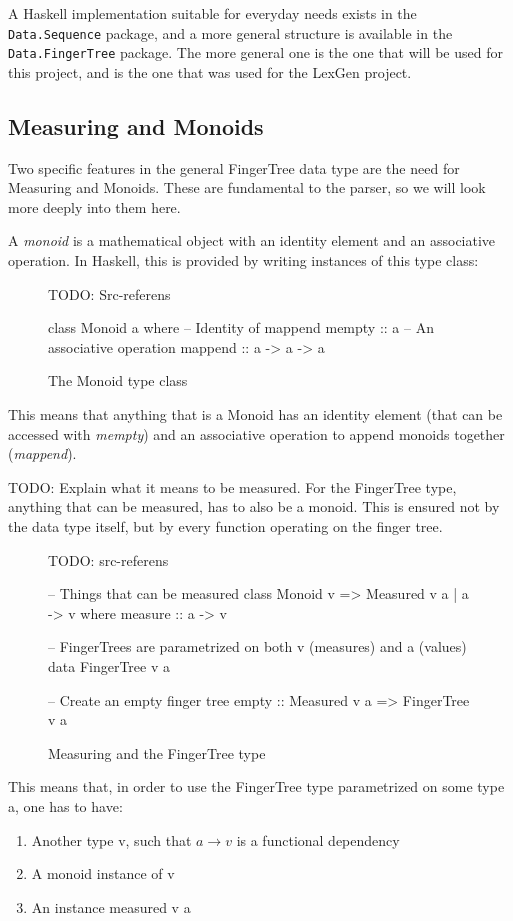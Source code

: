 \documentclass[a4paper,12pt,twosided]{report}
\begin{document}
A Haskell implementation suitable for everyday needs exists in the
\texttt{Data.Sequence} package, and a more general structure is available in the
\texttt{Data.FingerTree} package. The more general one is the one that will be
used for this project, and is the one that was used for the LexGen project.

\subsection{Measuring and Monoids}
Two specific features in the general FingerTree data type are the need for
Measuring and Monoids. These are fundamental to the parser, so we will look more
deeply into them here.

A \textit{monoid} is a mathematical object with an identity element and an
associative operation. In Haskell, this is provided by writing instances of this
type class:
\begin{figure}[H]
TODO: Src-referens
\begin{code}
class Monoid a where
    -- Identity of mappend
    mempty  :: a
    -- An associative operation
    mappend :: a -> a -> a
\end{code}
\caption{The Monoid type class}
\end{figure}
This means that anything that is a Monoid has an identity element (that can be
accessed with \textit{mempty}) and an associative operation to append monoids
together (\textit{mappend}).

TODO: Explain what it means to be measured.
For the FingerTree type, anything that can be measured, has to also be a monoid.
This is ensured not by the data type itself, but by every function operating on
the finger tree. 
\begin{figure}[H]
TODO: src-referens
\begin{code}
-- Things that can be measured
class Monoid v => Measured v a | a -> v where
    measure :: a -> v

-- FingerTrees are parametrized on both v (measures) and a (values)
data FingerTree v a

-- Create an empty finger tree
empty :: Measured v a => FingerTree v a
\end{code}
\caption{Measuring and the FingerTree type}
\end{figure}

This means that, in order to use the FingerTree type parametrized on some type
a, one has to have:
\begin{enumerate}
    \item{Another type v, such that $a \rightarrow v$ is a functional dependency}
    \item{A monoid instance of v}
    \item{An instance measured v a}
\end{enumerate}
\end{document}
